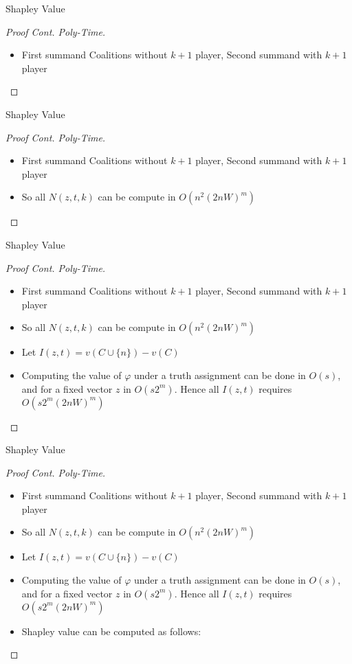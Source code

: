 \documentclass{beamer}
\begin{document}
\begin{frame}[fragile]{Shapley Value}
  \begin{proof}[Proof Cont. Poly-Time]
    \begin{itemize}
      \item First summand Coalitions without $k+1$ player, Second summand with $k+1$ player
    \end{itemize}
  \end{proof}
\end{frame}

\begin{frame}[fragile]{Shapley Value}
  \begin{proof}[Proof Cont. Poly-Time]
    \begin{itemize}
      \item First summand Coalitions without $k+1$ player, Second summand with $k+1$ player
      \item So all $N(z,t,k)$ can be compute in $O(n^2(2nW)^m)$
    \end{itemize}
  \end{proof}
\end{frame}

\begin{frame}[fragile]{Shapley Value}
  \begin{proof}[Proof Cont. Poly-Time]
    \begin{itemize}
      \item First summand Coalitions without $k+1$ player, Second summand with $k+1$ player
      \item So all $N(z,t,k)$ can be compute in $O(n^2(2nW)^m)$
      \item Let $I(z,t) = v(C \cup \{n\})-v(C)$
      \item Computing the value of $\varphi$ under a truth assignment can be done in $O(s)$, and for a fixed vector $z$ in $O(s2^m)$. Hence all $I(z,t)$ requires $O(s2^m(2nW)^m)$
    \end{itemize}
  \end{proof}
\end{frame}

\begin{frame}[fragile]{Shapley Value}
  \begin{proof}[Proof Cont. Poly-Time]
    \begin{itemize}
      \item First summand Coalitions without $k+1$ player, Second summand with $k+1$ player
      \item So all $N(z,t,k)$ can be compute in $O(n^2(2nW)^m)$
      \item Let $I(z,t) = v(C \cup \{n\})-v(C)$
      \item Computing the value of $\varphi$ under a truth assignment can be done in $O(s)$, and for a fixed vector $z$ in $O(s2^m)$. Hence all $I(z,t)$ requires $O(s2^m(2nW)^m)$
      \item Shapley value can be computed as follows:
    \end{itemize}
  \end{proof}
  \end{frame}
\end{document}
